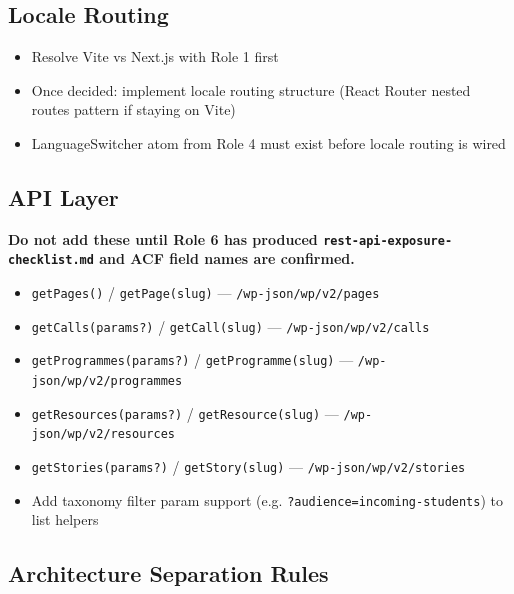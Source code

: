 \documentclass[12pt,a4paper]{article}
\begin{document}
\subsection{Locale Routing}

\begin{itemize}
    \item[$\square$] Resolve Vite vs Next.js with Role 1 first
    \item[$\square$] Once decided: implement locale routing structure (React Router nested routes pattern if staying on Vite)
    \item[$\square$] LanguageSwitcher atom from Role 4 must exist before locale routing is wired
\end{itemize}

\subsection{API Layer}

\begin{redbox}
\textbf{Do not add these until Role 6 has produced \texttt{rest-api-exposure-checklist.md}
and ACF field names are confirmed.}
\end{redbox}

\begin{itemize}
    \item[$\square$] \texttt{getPages()} / \texttt{getPage(slug)} --- \texttt{/wp-json/wp/v2/pages}
    \item[$\square$] \texttt{getCalls(params?)} / \texttt{getCall(slug)} --- \texttt{/wp-json/wp/v2/calls}
    \item[$\square$] \texttt{getProgrammes(params?)} / \texttt{getProgramme(slug)} --- \texttt{/wp-json/wp/v2/programmes}
    \item[$\square$] \texttt{getResources(params?)} / \texttt{getResource(slug)} --- \texttt{/wp-json/wp/v2/resources}
    \item[$\square$] \texttt{getStories(params?)} / \texttt{getStory(slug)} --- \texttt{/wp-json/wp/v2/stories}
    \item[$\square$] Add taxonomy filter param support (e.g. \texttt{?audience=incoming-students}) to list helpers
\end{itemize}

\subsection{Architecture Separation Rules}
\end{document}

